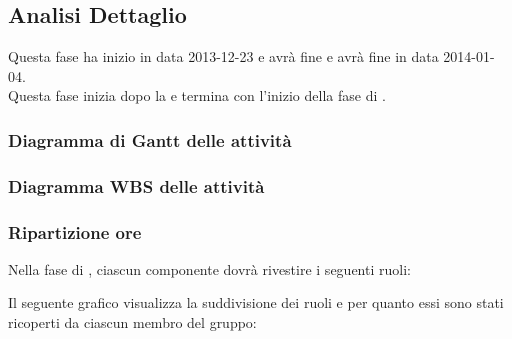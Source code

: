 \subsection{Analisi Dettaglio}
Questa fase ha inizio in data 2013-12-23 e avrà fine e avrà fine in data 2014-01-04.\\
Questa fase inizia dopo la  e termina con l'inizio della fase di .

\subsubsection{Diagramma di Gantt delle attività}

\newpage
\subsubsection{Diagramma WBS delle attività}

\newpage
\subsubsection{Ripartizione ore}

\newpage
Nella fase di , ciascun componente dovrà rivestire i seguenti ruoli:

Il seguente grafico visualizza la suddivisione dei ruoli e per quanto essi sono stati ricoperti da ciascun membro del gruppo:
